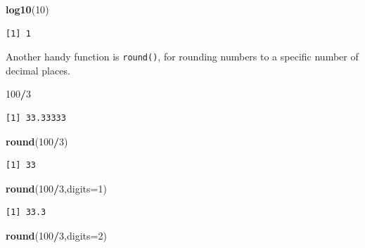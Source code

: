 \documentclass[
]{book}
\newenvironment{Shaded}{\begin{snugshade}}{\end{snugshade}}
\newcommand{\DataTypeTok}[1]{\textcolor[rgb]{0.13,0.29,0.53}{#1}}
\newcommand{\DecValTok}[1]{\textcolor[rgb]{0.00,0.00,0.81}{#1}}
\newcommand{\KeywordTok}[1]{\textcolor[rgb]{0.13,0.29,0.53}{\textbf{#1}}}
\newcommand{\NormalTok}[1]{#1}
\newcommand{\OperatorTok}[1]{\textcolor[rgb]{0.81,0.36,0.00}{\textbf{#1}}}
\begin{document}
\begin{Shaded}
\begin{Highlighting}[]
\KeywordTok{log10}\NormalTok{(}\DecValTok{10}\NormalTok{)}
\end{Highlighting}
\end{Shaded}

\begin{verbatim}
[1] 1
\end{verbatim}

Another handy function is \texttt{round()}, for rounding numbers to a specific number of decimal places.

\begin{Shaded}
\begin{Highlighting}[]
\DecValTok{100}\OperatorTok{/}\DecValTok{3}
\end{Highlighting}
\end{Shaded}

\begin{verbatim}
[1] 33.33333
\end{verbatim}

\begin{Shaded}
\begin{Highlighting}[]
\KeywordTok{round}\NormalTok{(}\DecValTok{100}\OperatorTok{/}\DecValTok{3}\NormalTok{)}
\end{Highlighting}
\end{Shaded}

\begin{verbatim}
[1] 33
\end{verbatim}

\begin{Shaded}
\begin{Highlighting}[]
\KeywordTok{round}\NormalTok{(}\DecValTok{100}\OperatorTok{/}\DecValTok{3}\NormalTok{,}\DataTypeTok{digits=}\DecValTok{1}\NormalTok{)}
\end{Highlighting}
\end{Shaded}

\begin{verbatim}
[1] 33.3
\end{verbatim}

\begin{Shaded}
\begin{Highlighting}[]
\KeywordTok{round}\NormalTok{(}\DecValTok{100}\OperatorTok{/}\DecValTok{3}\NormalTok{,}\DataTypeTok{digits=}\DecValTok{2}\NormalTok{)}
\end{Highlighting}
\end{Shaded}
\end{document}
